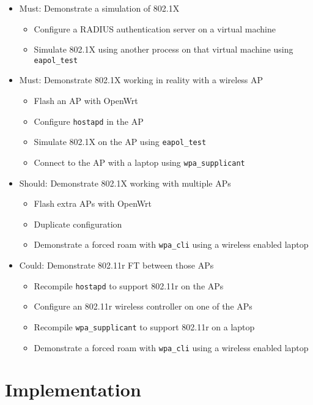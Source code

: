 \documentclass[pdftex, 12pt, a4paper]{article}
\begin{document}
\begin{itemize}
    \item Must: Demonstrate a simulation of 802.1X
    \begin{itemize}
        \item Configure a RADIUS authentication server on a virtual machine
        \item Simulate 802.1X using another process on that virtual machine using \verb`eapol_test`
    \end{itemize}
    \item Must: Demonstrate 802.1X working in reality with a wireless AP
    \begin{itemize}
        \item Flash an AP with OpenWrt
        \item Configure \verb`hostapd` in the AP
        \item Simulate 802.1X on the AP using \verb`eapol_test`
        \item Connect to the AP with a laptop using \verb`wpa_supplicant`
    \end{itemize}
    \item Should: Demonstrate 802.1X working with multiple APs
    \begin{itemize}
        \item Flash extra APs with OpenWrt
        \item Duplicate configuration
        \item Demonstrate a forced roam with \verb`wpa_cli` using a wireless enabled laptop
    \end{itemize}
    \item Could: Demonstrate 802.11r FT between those APs
    \begin{itemize}
        \item Recompile \verb`hostapd` to support 802.11r on the APs
        \item Configure an 802.11r wireless controller on one of the APs
        \item Recompile \verb`wpa_supplicant` to support 802.11r on a laptop
        \item Demonstrate a forced roam with \verb`wpa_cli` using a wireless enabled laptop
    \end{itemize}
\end{itemize}

\section{Implementation}
\end{document}
